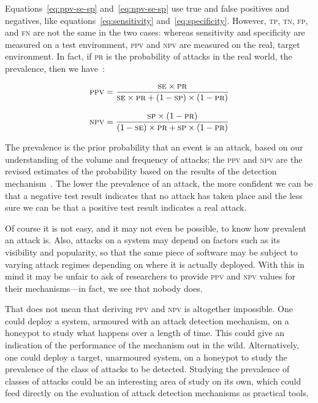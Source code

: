 \documentclass[conference]{IEEEtran}
\begin{document}
\noindent
Equations~\ref{eq:ppv-se-sp} and~\ref{eq:npv-se-sp} use true and false
positives and negatives, like equations~\ref{eq:sensitivity}
and~\ref{eq:specificity}. However, \textsc{tp}, \textsc{tn},
\textsc{fp}, and \textsc{fn} are not the same in the two cases:
whereas sensitivity and specificity are measured on a test
environment, \textsc{ppv} and \textsc{npv} are measured on the real,
target environment. In fact, if \textsc{pr} is the probability of
attacks in the real world, the prevalence, then we
have~\cite{linn2004,altman1994}:

\begin{equation}
\textsc{ppv} = \frac{\textsc{se}\times \textsc{pr}}{
\textsc{se}\times \textsc{pr} + (1 - \textsc{sp})\times (1 -
\textsc{pr})}
\label{eq:ppv-se-sp}
\end{equation}

\begin{equation}
\textsc{npv} = \frac{\textsc{sp}\times (1 - \textsc{pr})}{
(1 - \textsc{se})\times \textsc{pr} + \textsc{sp}\times (1 -
\textsc{pr})}
\label{eq:npv-se-sp}
\end{equation}

\noindent
The prevalence is the prior probability that an event is an attack,
based on our understanding of the volume and frequency of attacks; the
\textsc{ppv} and \textsc{npv} are the revised estimates of the
probability based on the results of the detection
mechanism~\cite{altman1994}. The lower the prevalence of an attack,
the more confident we can be that a negative test result indicates
that no attack has taken place and the less sure we can be that a
positive test result indicates a real attack. 

Of course it is not easy, and it may not even be possible, to know how
prevalent an attack is. Also, attacks on a system may depend on
factors such as its visibility and popularity, so that the same piece
of software may be subject to varying attack regimes depending on
where it is actually deployed. With this in mind it may be unfair to
ask of researchers to provide \textsc{ppv} and \textsc{npv} values for
their mechanisms---in fact, we see that nobody does.

That does not mean that deriving \textsc{ppv} and \textsc{npv} is
altogether impossible. One could deploy a system, armoured with an
attack detection mechanism, on a honeypot to study what happens over
a length of time. This could give an indication of the performance of
the mechanism out in the wild. Alternatively, one could deploy a
target, unarmoured system, on a honeypot to study the prevalence of
the class of attacks to be detected. Studying the prevalence of
classes of attacks could be an interesting area of study on its own,
which could feed directly on the evaluation of attack detection
mechanisms as practical tools.
\end{document}
